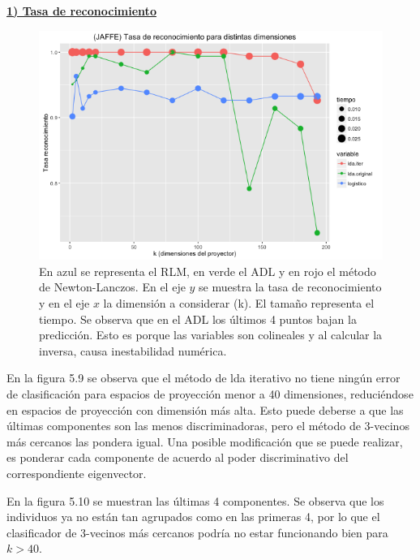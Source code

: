 \underline{\textbf{1) Tasa de reconocimiento}}

\begin{figure}[!ht]
  \centering
  \includegraphics[width=1\textwidth]{Figures/Chapter4_Comparacion_Jaf.png} 
  \caption[Comportamiento de los 3 métodos comparados (JAFFE)]
  {En azul se representa el RLM, en verde el ADL y en rojo el método de Newton-Lanczos. En el eje $y$ se muestra la tasa de reconocimiento y en el eje $x$ la dimensión a considerar (k). El tamaño representa el tiempo. Se observa que en el ADL los últimos 4 puntos bajan la predicción. Esto es porque las variables son colineales y al calcular la inversa, causa inestabilidad numérica.}
\end{figure}

En la figura 5.9 se observa que el método de lda iterativo no tiene ningún error de clasificación para espacios de proyección menor a 40 dimensiones, reduciéndose en espacios de proyección con dimensión más alta. Esto puede deberse a que las últimas componentes son las menos discriminadoras, pero el método de 3-vecinos más cercanos las pondera igual. Una posible modificación que se puede realizar, es ponderar cada componente de acuerdo al poder discriminativo del correspondiente eigenvector.

En la figura 5.10 se muestran las últimas 4 componentes. Se observa que los individuos ya no están tan agrupados como en las primeras 4, por lo que el clasificador de 3-vecinos más cercanos podría no estar funcionando bien para $k > 40$.


